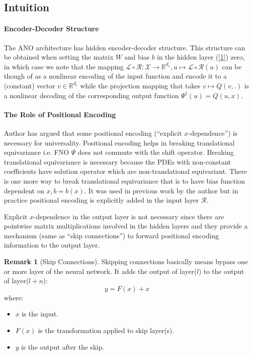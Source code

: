 \documentclass[reqno]{amsart}
\theoremstyle{plain}
\theoremstyle{definition}
\newtheorem{rem}{Remark}
\newcommand{\bb}[1]{\mathbb{#1}}
\newcommand{\cal}[1]{\mathcal{#1}}
\begin{document}
\subsection{Intuition}
\paragraph{\bf Encoder-Decoder Structure} The ANO architecture has hidden encoder-decoder structure. This structure can be obtained when setting the matrix $W$ and bias $b$ in the hidden layer (\ref{1}) zero, in which case we note that the mapping $\cal L \circ \cal R : \cal X \to \bb R^{d_c}, u \mapsto \cal L \circ \cal R(u)$ can be though of as a nonlinear encoding of the input function and encode it to a (constant) vector $v \in \bb R^{d_c}$ while the projection mapping that takes $v \mapsto Q(v,.)$ is a nonlinear decoding of the corresponding output function $\Psi^\dag(u) = Q(u,x)$.

\paragraph{\bf The Role of Positional Encoding}
Author has argued that some positional encoding (``explicit $x$-dependence'') is necessary for universality. Positional encoding helps in breaking translational equivariance i.e. FNO $\Psi$ does not commute with the shift operator. Breaking translational equivariance is necessary because the PDEs with non-constant coefficients have solution operator which are non-translational equivariant. There is one more way to break translational equivariance that is to have bias function dependent on $x, b = b(x)$. It was used in previous work by the author \cite{NK2021} but in practice positional encoding is explicitly added in the input layer $\cal R$.

\noindent Explicit $x$-dependence in the output layer is not necessary since there are pointwise matrix multiplications involved in the hidden layers and they provide a mechanism (same as ``skip connections'') to forward positional encoding information to the output layer.

\begin{rem}[Skip Connections]
    Skipping connections basically means bypass one or more layer of the neural network. It adds the output of layer($l$) to the output of layer($l+n$):
    $$ y = F(x) + x$$
    where:
    \begin{itemize}
        \item $x$ is the input.
        \item $F(x)$ is the transformation applied to skip layer(s).
        \item $y$ is the output after the skip.
    \end{itemize}
\end{rem}
\end{document}
